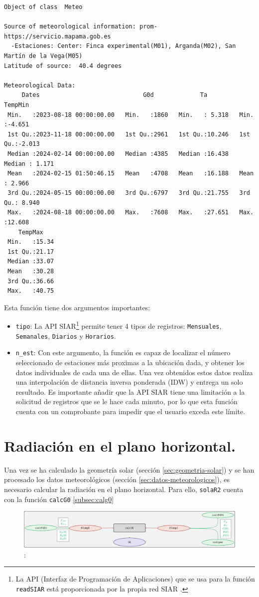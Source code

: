 \begin{verbatim}
Object of class  Meteo 

Source of meteorological information: prom-https://servicio.mapama.gob.es 
  -Estaciones: Center: Finca experimental(M01), Arganda(M02), San Martín de la Vega(M05) 
Latitude of source:  40.4 degrees

Meteorological Data:
     Dates                             G0d             Ta            TempMin      
 Min.   :2023-08-18 00:00:00.00   Min.   :1860   Min.   : 5.318   Min.   :-4.651  
 1st Qu.:2023-11-18 00:00:00.00   1st Qu.:2961   1st Qu.:10.246   1st Qu.:-2.013  
 Median :2024-02-14 00:00:00.00   Median :4385   Median :16.438   Median : 1.171  
 Mean   :2024-02-15 01:50:46.15   Mean   :4708   Mean   :16.188   Mean   : 2.966  
 3rd Qu.:2024-05-15 00:00:00.00   3rd Qu.:6797   3rd Qu.:21.755   3rd Qu.: 8.940  
 Max.   :2024-08-18 00:00:00.00   Max.   :7608   Max.   :27.651   Max.   :12.608  
    TempMax     
 Min.   :15.34  
 1st Qu.:21.17  
 Median :33.07  
 Mean   :30.28  
 3rd Qu.:36.66  
 Max.   :40.75
\end{verbatim}

Esta función tiene dos argumentos importantes:
\begin{itemize}
\item \texttt{tipo}: La API SIAR\footnote{La API (Interfaz de Programación de Aplicaciones) que se usa para la función \texttt{readSIAR} está proporcionada por la propia red SIAR \cite{siar23}.} permite tener 4 tipos de registros: \texttt{Mensuales}, \texttt{Semanales}, \texttt{Diarios} y \texttt{Horarios}.
\item \texttt{n\_est}: Con este argumento, la función es capaz de localizar el número seleccionado de estaciones más proximas a la ubicación dada, y obtener los datos individuales de cada una de ellas. Una vez obtenidos estos datos realiza una interpolación de distancia inversa ponderada (IDW) y entrega un solo resultado. Es importante añadir que la API SIAR tiene una limitación a la solicitud de registros que se le hace cada minuto, por lo que esta función cuenta con un comprobante para impedir que el usuario exceda este límite.
\end{itemize}

\section{Radiación en el plano horizontal.}
\label{sec:org8c8adbc}
Una vez se ha calculado la geometría solar (sección \ref{sec:geometria-solar}) y se han procesado los datos meteorológicos (sección \ref{sec:datos-meteorologicos}), es necesario calcular la radiación en el plano horizontal. Para ello, \texttt{solaR2} cuenta con la función \texttt{calcG0} \ref{subsec:calg0}
\begin{figure}[]
\centering
\includegraphics[keepaspectratio,width=\textwidth,height=0.5\textheight]{figuras/calcg0.pdf}
\caption{:\label{fig:calcg0}}
\end{figure}
